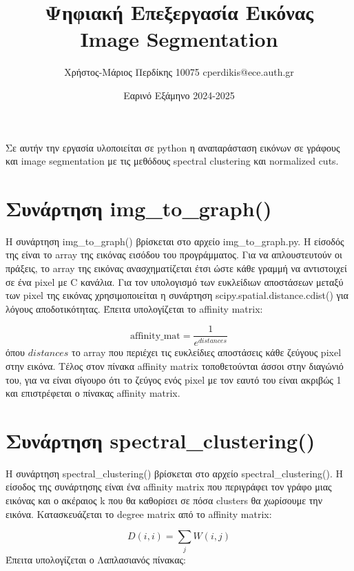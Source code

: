 \documentclass{article}
\title{Ψηφιακή Επεξεργασία Εικόνας \\ Image Segmentation}
\date{Εαρινό Εξάμηνο 2024-2025}
\author{Χρήστος-Μάριος Περδίκης 10075 cperdikis@ece.auth.gr}
\begin{document}
\maketitle
Σε αυτήν την εργασία υλοποιείται σε python η αναπαράσταση εικόνων σε γράφους και image
segmentation με τις μεθόδους spectral clustering και normalized cuts.


\section{Συνάρτηση img\_to\_graph()}
Η συνάρτηση img\_to\_graph() βρίσκεται στο αρχείο img\_to\_graph.py. Η είσοδός της
είναι το array της εικόνας εισόδου του προγράμματος. Για να απλουστευτούν οι πράξεις, 
το array της εικόνας 
ανασχηματίζεται έτσι ώστε κάθε γραμμή να αντιστοιχεί σε ένα pixel με C κανάλια. 
Για τον υπολογισμό των ευκλείδιων αποστάσεων 
μεταξύ των pixel της εικόνας χρησιμοποιείται η συνάρτηση scipy.spatial.distance.cdist()
για λόγους αποδοτικότητας. Έπειτα υπολογίζεται το affinity matrix:

\begin{equation}
    \text{affinity\_mat} = \frac{1}{e^{distances}}
\end{equation}
όπου $distances$ το array που περιέχει τις ευκλείδιες αποστάσεις κάθε ζεύγους
pixel στην εικόνα. Τέλος στον πίνακα affinity matrix τοποθετούνται άσσοι στην
διαγώνιό του, για να είναι σίγουρο ότι το ζεύγος ενός pixel με τον εαυτό του
είναι ακριβώς 1 και επιστρέφεται ο πίνακας affinity matrix.

\section{Συνάρτηση spectral\_clustering()}
Η συνάρτηση spectral\_clustering() βρίσκεται στο αρχείο spectral\_clustering().
Η είσοδος της συνάρτησης είναι ένα affinity matrix που περιγράφει τον γράφο μιας
εικόνας και ο ακέραιος k που θα καθορίσει σε πόσα clusters θα χωρίσουμε την εικόνα.
Κατασκευάζεται το degree matrix από το affinity matrix:

\begin{equation}
    D(i, i) = \sum_j W(i, j)
\end{equation}
Έπειτα υπολογίζεται ο Λαπλασιανός πίνακας:
\end{document}
